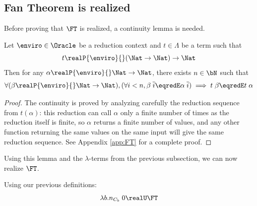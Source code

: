\subsection{Fan Theorem is realized}

Before proving that $\FT$ is realized, a continuity lemma is needed.

\begin{lemma}[Continuity]\label{lem:continuity}
  Let $\enviro\in\Oracle$ be a reduction context and $t \in \Lambda$ be a term such that
  \[t \realP{\enviro}{} (\Nat \to \Nat) \to \Nat\]
  Then for any $\alpha \realP{\enviro}{} \Nat \to \Nat$, there exists $n\in \bN$ such that
  \[\forall (\beta \realP{\enviro}{} \Nat \to \Nat), (\forall i < n, \beta\;\overline i \eqredE \alpha\;\overline i) \implies t\;\beta \eqredE t\;\alpha\]
\end{lemma}
\begin{proof}
The continuity is proved by analyzing carefully the reduction sequence from $t(\alpha)$: this reduction can call $\alpha$ only a finite number of times as the reduction itself is finite, so $\alpha$ returns a finite number of values, and any other function returning the same values on the same input will give the same reduction sequence. See Appendix \ref{app:FT} for a complete proof.
\end{proof}

Using this lemma and the $\lambda$-terms from the previous subsection, we can now realize $\FT$.

\begin{theorem}\label{thm:FT}
  Using our previous definitions:
  \[\lambda b. n_{C_b}\;0 \realU \FT\]
\end{theorem}

